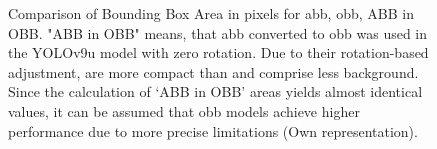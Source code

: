 \begin{figure}[htbp]
    \centering
    
    \caption[Comparison of Bounding Box Area in pixels for \acrshort{abb}, \acrshort{obb}, abb in obb]{Comparison of Bounding Box Area in pixels for \acrshort{abb}, \acrshort{obb}, ABB in OBB. "ABB in OBB" means, that \acrlong{abb} converted to obb was used in the \acrshort{YOLO}v9u model with zero rotation. Due to their rotation-based adjustment,  are more compact than  and comprise less background. Since the calculation of ‘ABB in OBB’ areas yields almost identical values, it can be assumed that \acrshort{obb} models achieve higher performance due to more precise limitations (Own representation).}
    \label{fig:bbox_area}
\end{figure}


